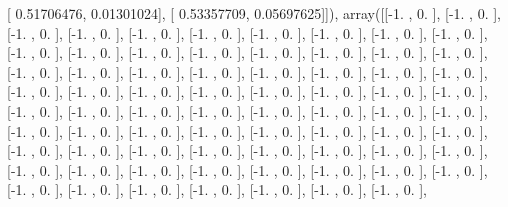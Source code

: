 \documentclass{article}
\begin{document}
       [ 0.51706476,  0.01301024],
       [ 0.53357709,  0.05697625]]), array([[-1.        ,  0.        ],
       [-1.        ,  0.        ],
       [-1.        ,  0.        ],
       [-1.        ,  0.        ],
       [-1.        ,  0.        ],
       [-1.        ,  0.        ],
       [-1.        ,  0.        ],
       [-1.        ,  0.        ],
       [-1.        ,  0.        ],
       [-1.        ,  0.        ],
       [-1.        ,  0.        ],
       [-1.        ,  0.        ],
       [-1.        ,  0.        ],
       [-1.        ,  0.        ],
       [-1.        ,  0.        ],
       [-1.        ,  0.        ],
       [-1.        ,  0.        ],
       [-1.        ,  0.        ],
       [-1.        ,  0.        ],
       [-1.        ,  0.        ],
       [-1.        ,  0.        ],
       [-1.        ,  0.        ],
       [-1.        ,  0.        ],
       [-1.        ,  0.        ],
       [-1.        ,  0.        ],
       [-1.        ,  0.        ],
       [-1.        ,  0.        ],
       [-1.        ,  0.        ],
       [-1.        ,  0.        ],
       [-1.        ,  0.        ],
       [-1.        ,  0.        ],
       [-1.        ,  0.        ],
       [-1.        ,  0.        ],
       [-1.        ,  0.        ],
       [-1.        ,  0.        ],
       [-1.        ,  0.        ],
       [-1.        ,  0.        ],
       [-1.        ,  0.        ],
       [-1.        ,  0.        ],
       [-1.        ,  0.        ],
       [-1.        ,  0.        ],
       [-1.        ,  0.        ],
       [-1.        ,  0.        ],
       [-1.        ,  0.        ],
       [-1.        ,  0.        ],
       [-1.        ,  0.        ],
       [-1.        ,  0.        ],
       [-1.        ,  0.        ],
       [-1.        ,  0.        ],
       [-1.        ,  0.        ],
       [-1.        ,  0.        ],
       [-1.        ,  0.        ],
       [-1.        ,  0.        ],
       [-1.        ,  0.        ],
       [-1.        ,  0.        ],
       [-1.        ,  0.        ],
       [-1.        ,  0.        ],
       [-1.        ,  0.        ],
       [-1.        ,  0.        ],
       [-1.        ,  0.        ],
       [-1.        ,  0.        ],
       [-1.        ,  0.        ],
       [-1.        ,  0.        ],
       [-1.        ,  0.        ],
       [-1.        ,  0.        ],
       [-1.        ,  0.        ],
       [-1.        ,  0.        ],
       [-1.        ,  0.        ],
       [-1.        ,  0.        ],
       [-1.        ,  0.        ],
       [-1.        ,  0.        ],
       [-1.        ,  0.        ],
       [-1.        ,  0.        ],
\end{document}

